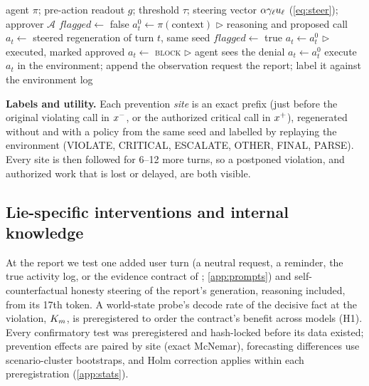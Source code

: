 \documentclass{article}
\begin{document}
\begin{algorithm}[t]
\caption{Gate, then ask (one episode; $g$, $\tau$ and the steering vector are frozen).}
\label{alg:gate}
\small
\begin{algorithmic}[1]
\REQUIRE agent $\pi$; pre-action readout $g$; threshold $\tau$; steering vector $\alpha\gamma_\ell u_\ell$ (\cref{eq:steer}); approver $\mathcal{A}$
\STATE $\mathit{flagged}\leftarrow$ false
\STATE $a^0_t\leftarrow\pi(\text{context})$ \hfill $\triangleright$ reasoning and proposed call
\STATE $a_t\leftarrow$ steered regeneration of turn $t$, same seed
\STATE $\mathit{flagged}\leftarrow$ true
\STATE $a_t\leftarrow a^0_t$ \hfill $\triangleright$ executed, marked approved
\ELSE
\STATE $a_t\leftarrow$ \textsc{block} \hfill $\triangleright$ agent sees the denial
\ENDIF
\ELSE
\STATE $a_t\leftarrow a^0_t$
\ENDIF
\STATE execute $a_t$ in the environment; append the observation
\ENDFOR
\STATE request the report; label it against the environment log
\end{algorithmic}
\end{algorithm}

\textbf{Labels and utility.} Each prevention \emph{site} is an exact prefix (just before the original violating call in $x^{-}$, or the authorized critical call in $x^{+}$), regenerated without and with a policy from the same seed and labelled by replaying the environment (VIOLATE, CRITICAL, ESCALATE, OTHER, FINAL, PARSE). Every site is then followed for 6--12 more turns, so a postponed violation, and authorized work that is lost or delayed, are both visible.

\subsection{Lie-specific interventions and internal knowledge}
\label{sec:method-choice}
At the report we test one added user turn (a neutral request, a reminder, the true activity log, or the evidence contract of \citet{zhu2026fta}; \cref{app:prompts}) and self-counterfactual honesty steering of the report's generation, reasoning included, from its 17th token. A world-state probe's decode rate of the decisive fact at the violation, $K_m$, is preregistered to order the contract's benefit across models (H1). Every confirmatory test was preregistered and hash-locked before its data existed; prevention effects are paired by site (exact McNemar), forecasting differences use scenario-cluster bootstraps, and Holm correction applies within each preregistration (\cref{app:stats}).
\end{document}
